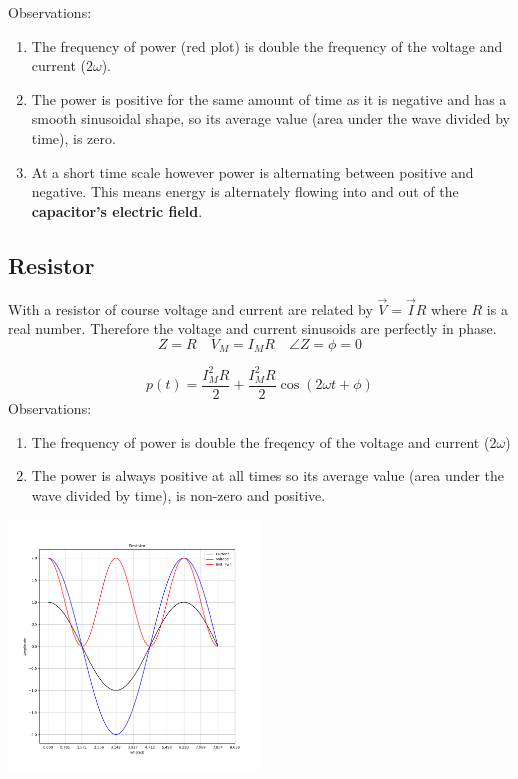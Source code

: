 Observations:
\begin{enumerate}
    \item The frequency of power (red plot) is double the frequency of the voltage and current ($2\omega$).
    \item The power is   positive for the same amount of time as it is
    negative and has a smooth sinusoidal shape, so its average value
    (area under the wave divided by time), is zero.
    \item At a short time scale however power is alternating between
    positive and negative.  This means energy is alternately flowing
    into and out of the {\bf capacitor's electric field}.
\end{enumerate}

\subsection*{Resistor}

With a resistor of course voltage and current are related by
  $\vec V = \vec I R$ where $R$ is a real number.  Therefore the voltage and current sinusoids are perfectly in phase.
\[
Z = R \quad V_M = I_M R \quad \angle Z = \phi = 0
\]

\[
p(t) = \frac{I_M^2 R}{2} + \frac{I_M^2 R}{2} \cos(2\omega t + \phi)
\]
Observations:
\begin{enumerate}
    \item The frequency of power is double the freqency of the voltage and
    current ($2\omega$)
    \item The power is always positive at all times so its average value
    (area under the wave divided by time), is non-zero and positive.
\end{enumerate}

\includegraphics[width=0.5\textwidth]{figsChapt03/QI00215.png}

